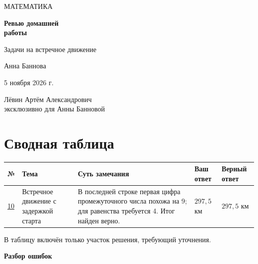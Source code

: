 \documentclass[a4paper,12pt]{article}
\begin{document}
\begin{titlepage}
\centering
\vspace*{21mm}
{\large\color{muted} МАТЕМАТИКА\par}
\vspace{20mm}
{\Huge\bfseries\color{ink} Ревью домашней\\[5pt] работы\par}
\vspace{13mm}
{\large Задачи на встречное движение\par}
\vspace{19mm}
{\Large Анна Баннова\par}
\vspace{8mm}
{\large 5 ноября 2026 г.\par}
\vfill
{\color{muted}\normalsize Лёвин Артём Александрович\\[4pt]
эксклюзивно для Анны Банновой\par}
\vspace{13mm}
\end{titlepage}

\section*{Сводная таблица}
\vspace{3mm}
\small
\begin{tabularx}{\linewidth}{@{}>{\raggedright\arraybackslash}p{13mm}>{\raggedright\arraybackslash}p{27mm}X>{\raggedright\arraybackslash}p{21mm}>{\raggedright\arraybackslash}p{24mm}@{}}
\toprule
\textbf{№} & \textbf{Тема} & \textbf{Суть замечания} & \textbf{Ваш ответ} & \textbf{Верный ответ}\\
\midrule
\hyperref[task:10]{10} & Встречное движение с задержкой старта & В последней строке первая цифра промежуточного числа похожа на 9; для равенства требуется 4. Итог найден верно. & $297{,}5$ км & $297{,}5$ км\\
\bottomrule
\end{tabularx}
\normalsize
\vspace{8mm}
\textcolor{muted}{\small В таблицу включён только участок решения, требующий уточнения.}

\newpage
\thispagestyle{empty}
\vspace*{\fill}
\begin{center}
{\Huge\bfseries\color{ink} Разбор ошибок}
\end{center}
\vspace*{\fill}
\newpage
\end{document}
